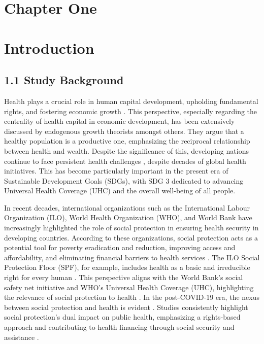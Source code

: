 \section*{\centering Chapter One}
\section*{\centering Introduction}

\subsection*{1.1 \quad Study Background} 

Health plays a crucial role in human capital development, upholding fundamental rights, and fostering economic growth \parencite{yogo_health_2015}. This perspective, especially regarding the centrality of health capital in economic development, has been extensively discussed by endogenous growth theorists \textcite{grossman_concept_1972, ostlin_paying_2004, sen_health_1998} amongst others. They argue that a healthy population is a productive one, emphasizing the reciprocal relationship between health and wealth. Despite the significance of this, developing nations continue to face persistent health challenges \parencite{gama_health_2015}, despite decades of global health initiatives. This has become particularly important in the present era of Sustainable Development Goals (SDGs), with SDG 3 dedicated to advancing Universal Health Coverage (UHC) and the overall well-being of all people.

In recent decades, international organizations such as the International Labour Organization (ILO), World Health Organization (WHO), and World Bank have increasingly highlighted the role of social protection in ensuring health security in developing countries. According to these organizations, social protection acts as a potential tool for poverty eradication and reduction, improving access and affordability, and eliminating financial barriers to health services \parencite{fox_clinical_2015, who_world_2010}. The ILO Social Protection Floor (SPF), for example, includes health as a basic and irreducible right for every human \parencite{ilo_social_2012, ilo_towards_2020}. This perspective aligns with the World Bank's social safety net initiative and WHO's Universal Health Coverage (UHC), highlighting the relevance of social protection to health \parencite{jorgensen_social_2019, lonnroth_beyond_2014, siroka_association_2016, who_world_2010}. In the post-COVID-19 era, the nexus between social protection and health is evident \parencite[see][]{yokobori_roles_2023}. Studies consistently highlight social protection's dual impact on public health, emphasizing a rights-based approach and contributing to health financing through social security and assistance \parencite{hagemejer_role_2013, ilo_towards_2020, macnaughton_decent_2010, yokobori_roles_2023, scheil-adlung_response_2014, scheil-adlung_focusing_2020}.

